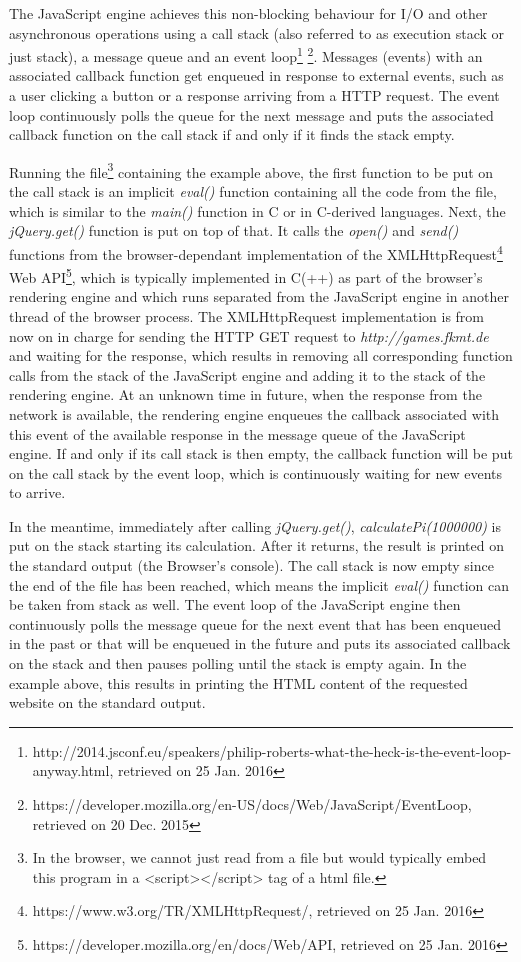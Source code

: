 The JavaScript engine achieves this non-blocking behaviour for I/O and other asynchronous operations using a call stack (also referred to as execution stack or just stack), a message queue and an event loop\footnote{http://2014.jsconf.eu/speakers/philip-roberts-what-the-heck-is-the-event-loop-anyway.html, retrieved on 25 Jan. 2016} \footnote{https://developer.mozilla.org/en-US/docs/Web/JavaScript/EventLoop, retrieved on 20 Dec. 2015}. Messages (events) with an associated callback function get enqueued in response to external events, such as a user clicking a button or a response arriving from a HTTP request. The event loop continuously polls the queue for the next message and puts the associated callback function on the call stack if and only if it finds the stack empty.

Running the file\footnote{In the browser, we cannot just read from a file but would typically embed this program in a <script></script> tag of a html file.} containing the example above, the first function to be put on the call stack is an implicit \textit{eval()} function containing all the code from the file, which is similar to the \textit{main()} function in C or in C-derived languages. Next, the \textit{jQuery.get()} function is put on top of that. It calls the \textit{open()} and \textit{send()} functions from the browser-dependant implementation of the XMLHttpRequest\footnote{https://www.w3.org/TR/XMLHttpRequest/, retrieved on 25 Jan. 2016 } Web API\footnote{https://developer.mozilla.org/en/docs/Web/API, retrieved on 25 Jan. 2016}, which is typically implemented in C(++) as part of the browser's rendering engine and which runs separated from the JavaScript engine in another thread of the browser process. The XMLHttpRequest implementation is from now on in charge for sending the HTTP GET request to \textit{http://games.fkmt.de} and waiting for the response, which results in removing all corresponding function calls from the stack of the JavaScript engine and adding it to the stack of the rendering engine. At an unknown time in future, when the response from the network is available, the rendering engine enqueues the callback associated with this event of the available response in the message queue of the JavaScript engine. If and only if its call stack is then empty, the callback function will be put on the call stack by the event loop, which is continuously waiting for new events to arrive.  

In the meantime, immediately after calling \textit{jQuery.get()}, \textit{calculatePi(1000000)} is put on the stack starting its calculation. After it returns, the result is printed on the standard output (the Browser's console). The call stack is now empty since the end of the file has been reached, which means the implicit \textit{eval()} function can be taken from stack as well. The event loop of the JavaScript engine then continuously polls the message queue for the next event that has been enqueued in the past or that will be enqueued in the future and puts its associated callback on the stack and then pauses polling until the stack is empty again. In the example above, this results in printing the HTML content of the requested website on the standard output.


